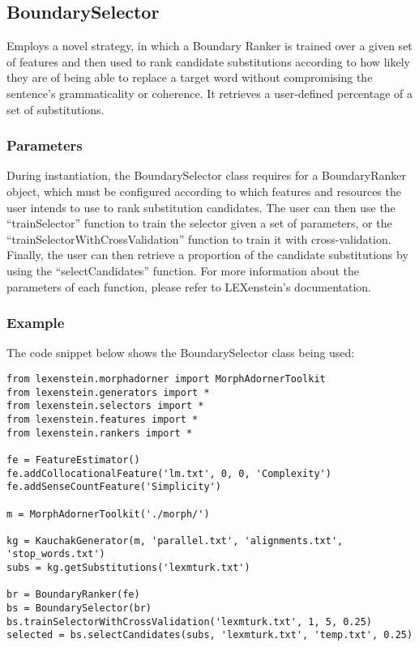 \subsection{BoundarySelector}

Employs a novel strategy, in which a Boundary Ranker is trained over a given set of features and then used to rank candidate substitutions according to how likely they are of being able to replace a target word without compromising the sentence's grammaticality or coherence. It retrieves a user-defined percentage of a set of substitutions.

\subsubsection{Parameters}

During instantiation, the BoundarySelector class requires for a BoundaryRanker object, which must be configured according to which features and resources the user intends to use to rank substitution candidates. The user can then use the ``trainSelector'' function to train the selector given a set of parameters, or the ``trainSelectorWithCrossValidation'' function to train it with cross-validation. Finally, the user can then retrieve a proportion of the candidate substitutions by using the ``selectCandidates'' function. For more information about the parameters of each function, please refer to LEXenstein's documentation.

\subsubsection{Example}

The code snippet below shows the BoundarySelector class being used:

\begin{lstlisting}
from lexenstein.morphadorner import MorphAdornerToolkit
from lexenstein.generators import *
from lexenstein.selectors import *
from lexenstein.features import *
from lexenstein.rankers import *

fe = FeatureEstimator()
fe.addCollocationalFeature('lm.txt', 0, 0, 'Complexity')
fe.addSenseCountFeature('Simplicity')

m = MorphAdornerToolkit('./morph/')

kg = KauchakGenerator(m, 'parallel.txt', 'alignments.txt', 'stop_words.txt')
subs = kg.getSubstitutions('lexmturk.txt')

br = BoundaryRanker(fe)
bs = BoundarySelector(br)
bs.trainSelectorWithCrossValidation('lexmturk.txt', 1, 5, 0.25)
selected = bs.selectCandidates(subs, 'lexmturk.txt', 'temp.txt', 0.25)
\end{lstlisting}










